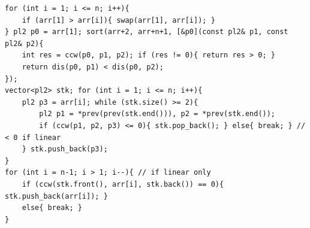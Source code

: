 \begin{verbatim}
for (int i = 1; i <= n; i++){
	if (arr[1] > arr[i]){ swap(arr[1], arr[i]); }
} pl2 p0 = arr[1]; sort(arr+2, arr+n+1, [&p0](const pl2& p1, const pl2& p2){
	int res = ccw(p0, p1, p2); if (res != 0){ return res > 0; }
	return dis(p0, p1) < dis(p0, p2);
});
vector<pl2> stk; for (int i = 1; i <= n; i++){
	pl2 p3 = arr[i]; while (stk.size() >= 2){
		pl2 p1 = *prev(prev(stk.end())), p2 = *prev(stk.end());
		if (ccw(p1, p2, p3) <= 0){ stk.pop_back(); } else{ break; } // < 0 if linear
	} stk.push_back(p3);
}
for (int i = n-1; i > 1; i--){ // if linear only
	if (ccw(stk.front(), arr[i], stk.back()) == 0){ stk.push_back(arr[i]); }
	else{ break; }
}
\end{verbatim}